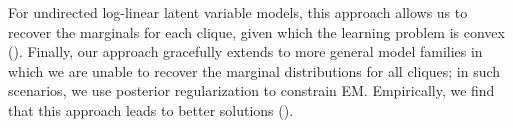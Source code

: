 For undirected log-linear latent variable models, this approach allows us to 
  recover the marginals for each clique, given which the learning
  problem is convex ().
Finally, our approach gracefully extends to more general model families
  in which we are unable to recover the marginal distributions for all
  cliques; in such scenarios, we use posterior regularization to constrain
  EM. 
Empirically, we find that this approach leads to better solutions
  ().

